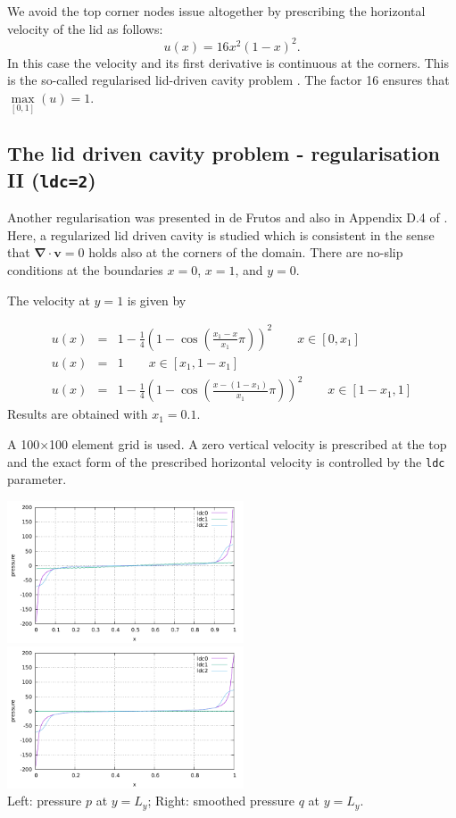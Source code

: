 We avoid the top corner nodes issue altogether by  
prescribing the horizontal velocity of the lid as follows: 
\begin{equation}
u(x)=16x^2(1-x)^2.
\end{equation}
In this case the velocity and its first derivative is continuous at the corners. This is the so-called regularised lid-driven cavity problem \cite{piva94}. The factor 16 ensures that $\max\limits_{[0,1]}(u)=1$.
 
\subsection*{The lid driven cavity problem - regularisation II ({\tt ldc=2})}

Another regularisation was presented in de Frutos \etal \cite{dejn16} and 
also in Appendix D.4 of \cite{john16}. 
Here, a regularized lid driven cavity is studied which is consistent in the sense that 
${\bm \nabla}\cdot{\bm v}=0$ 
holds also at the corners of the domain.
There are no-slip conditions at the boundaries $x=0$, $x=1$, and $y=0$. 

The velocity at $y=1$ is given by

\begin{eqnarray}
u(x) &=& 1-\frac{1}{4}\left( 1-\cos (\frac{x_1-x}{x_1}\pi)  \right)^2   \quad\quad x\in[0,x_1] \nonumber\\
u(x) &=& 1 \quad\quad x\in[x_1,1-x_1] \nonumber\\
u(x) &=& 1-\frac{1}{4}\left( 1-\cos (\frac{x-(1-x_1)}{x_1}\pi)  \right)^2   \quad\quad x\in[1-x_1,1]
\end{eqnarray}
Results are obtained with $x_1=0.1$.

\newpage
A 100$\times$100 element grid is used. 
A zero vertical velocity is prescribed at the top and the exact form of the 
prescribed horizontal velocity is controlled by the {\tt ldc} parameter.

\begin{center}
\includegraphics[width=7cm]{python_codes/fieldstone_04/results/p.pdf}
\includegraphics[width=7cm]{python_codes/fieldstone_04/results/q.pdf}\\
{\captionfont Left: pressure $p$ at $y=L_y$; Right: smoothed pressure $q$ at $y=L_y$.}
\end{center}

